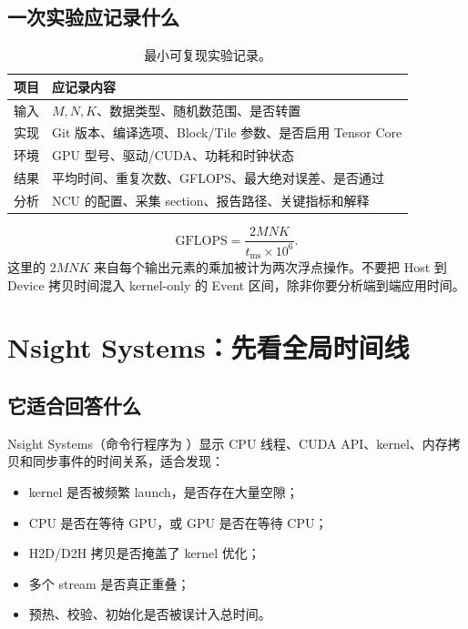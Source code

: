\documentclass[UTF8,11pt,a4paper,fontset=fandol]{ctexart}
\newcommand{\code}[1]{\texttt{\detokenize{#1}}}
\newcommand{\pagebreakhere}{\clearpage}
\begin{document}
\subsection{一次实验应记录什么}
\begin{table}[H]\centering\small
\begin{tabularx}{\linewidth}{lX}
\toprule
项目 & 应记录内容\\\midrule
输入 & $M,N,K$、数据类型、随机数范围、是否转置\\
实现 & Git 版本、编译选项、Block/Tile 参数、是否启用 Tensor Core\\
环境 & GPU 型号、驱动/CUDA、功耗和时钟状态\\
结果 & 平均时间、重复次数、GFLOPS、最大绝对误差、是否通过\\
分析 & NCU 的配置、采集 section、报告路径、关键指标和解释\\
\bottomrule
\end{tabularx}
\caption{最小可复现实验记录。}
\end{table}

\begin{equation}
  \mathrm{GFLOPS}=\frac{2MNK}{t_{\mathrm{ms}}\times10^6}.
\end{equation}
这里的 $2MNK$ 来自每个输出元素的乘加被计为两次浮点操作。不要把 Host 到 Device 拷贝时间混入 kernel-only 的 Event 区间，除非你要分析端到端应用时间。

\pagebreakhere
\section{Nsight Systems：先看全局时间线}
\subsection{它适合回答什么}
Nsight Systems（命令行程序为 \code{nsys}）显示 CPU 线程、CUDA API、kernel、内存拷贝和同步事件的时间关系，适合发现：
\begin{itemize}
  \item kernel 是否被频繁 launch，是否存在大量空隙；
  \item CPU 是否在等待 GPU，或 GPU 是否在等待 CPU；
  \item H2D/D2H 拷贝是否掩盖了 kernel 优化；
  \item 多个 stream 是否真正重叠；
  \item 预热、校验、初始化是否被误计入总时间。
\end{itemize}
\end{document}
